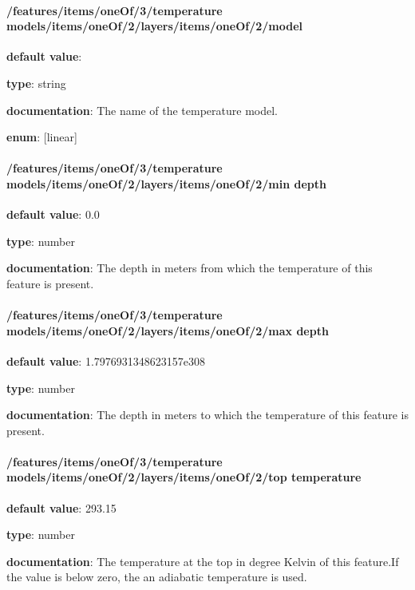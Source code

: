 \paragraph{/features/items/oneOf/3/temperature models/items/oneOf/2/layers/items/oneOf/2/model} \begin{itemized}
\item {\bf default value}: 
\item {\bf type}: string
\item {\bf documentation}: The name of the temperature model.
\item {\bf enum}: [linear]\end{itemized}\paragraph{/features/items/oneOf/3/temperature models/items/oneOf/2/layers/items/oneOf/2/min depth} \begin{itemized}
\item {\bf default value}: 0.0
\item {\bf type}: number
\item {\bf documentation}: The depth in meters from which the temperature of this feature is present.
\end{itemized}\paragraph{/features/items/oneOf/3/temperature models/items/oneOf/2/layers/items/oneOf/2/max depth} \begin{itemized}
\item {\bf default value}: 1.7976931348623157e308
\item {\bf type}: number
\item {\bf documentation}: The depth in meters to which the temperature of this feature is present.
\end{itemized}\paragraph{/features/items/oneOf/3/temperature models/items/oneOf/2/layers/items/oneOf/2/top temperature} \begin{itemized}
\item {\bf default value}: 293.15
\item {\bf type}: number
\item {\bf documentation}: The temperature at the top in degree Kelvin of this feature.If the value is below zero, the an adiabatic temperature is used.

\end{itemized}
